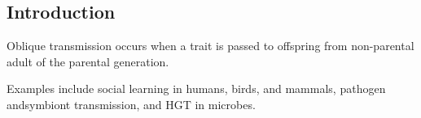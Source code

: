 \documentclass[a0,landscape]{a0poster}
\begin{document}
\begin{multicols}{4} %


%
%
%


\color{Navy} %

\section*{Introduction}

Oblique transmission occurs when a trait is passed to offspring from non-parental adult of the parental generation.

Examples include social learning in humans, birds, and mammals, pathogen andsymbiont transmission, and HGT in microbes.



\end{multicols}
\end{document}
